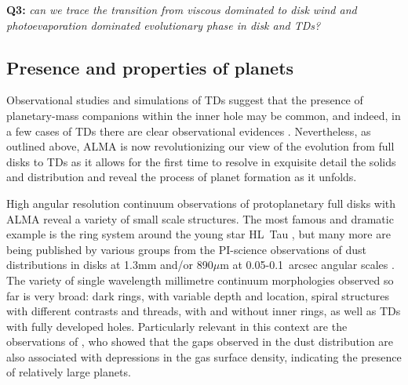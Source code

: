 \documentclass[10pt,fleqn,twoside]{article}
\begin{document}
\smallskip
{\bf Q3:} {\it can we trace the transition from viscous dominated to disk wind and photoevaporation dominated evolutionary phase in disk and TDs?}

\subsection{Presence and properties of planets}

Observational studies and simulations of TDs suggest that the presence of planetary-mass companions within the inner hole may be common, and indeed, in a few cases of TDs there are clear observational evidences \citep[e.g.\ ][see also Fig.~\ref{f_examples}]{2014ApJ...792L..23R,2015Natur.527..342S,2016ApJ...832..178V}.
Nevertheless, 
as outlined above, ALMA is now revolutionizing our view of the evolution from full disks to TDs as it allows for the first time to resolve in exquisite detail the solids and distribution and reveal the process of planet formation as it unfolds.

High angular resolution continuum observations of protoplanetary full disks with ALMA reveal a variety of small scale structures. The most famous and dramatic example is the ring system around the young star HL~Tau \citep{2015ApJ...808L...3A}, but many more are being published by various groups from the PI-science observations of dust distributions in disks at 1.3mm and/or 890$\mu$m at 0.05-0.1~arcsec angular scales \citep[e.g.\ TW~Hya, HD~163296, Elias~2--27,][among others]{2016ApJ...820L..40A,Isella2016,2016Sci...353.1519P}. The variety of single wavelength millimetre continuum morphologies observed so far is very broad: dark rings, with variable depth and location,  spiral structures with different contrasts and threads, with and without inner rings, as well as TDs with fully developed holes. Particularly relevant in this context are the observations of \citet{Isella2016}, who showed that the gaps observed in the dust distribution are also associated with depressions in the gas surface density, indicating the presence of relatively large planets.
\end{document}
